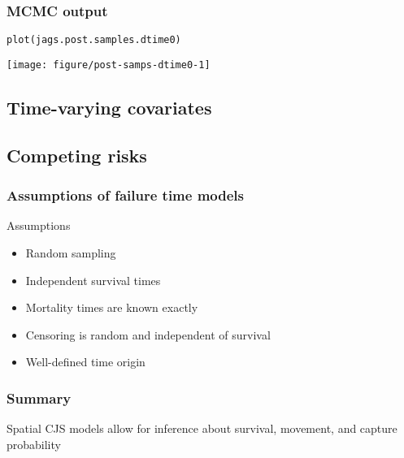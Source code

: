 \documentclass[color=usenames,dvipsnames]{beamer}\usepackage[]{graphicx}\usepackage[]{color}
\makeatletter
\newcommand{\hlstd}[1]{\textcolor[rgb]{0,0,0}{#1}}%
\newcommand{\hlkwd}[1]{\textcolor[rgb]{0.004,0.004,0.506}{#1}}%
\newenvironment{kframe}{%
 \def\at@end@of@kframe{}%
 \ifinner\ifhmode%
  \def\at@end@of@kframe{\end{minipage}}%
  \begin{minipage}{\columnwidth}%
 \fi\fi%
 \def\FrameCommand##1{\hskip\@totalleftmargin \hskip-\fboxsep
 \colorbox{shadecolor}{##1}\hskip-\fboxsep
     \hskip-\linewidth \hskip-\@totalleftmargin \hskip\columnwidth}%
 \MakeFramed {\advance\hsize-\width
   \@totalleftmargin\z@ \linewidth\hsize
   \@setminipage}}%
 {\par\unskip\endMakeFramed%
 \at@end@of@kframe}
\newenvironment{knitrout}{}{} %
\makeatother
\begin{document}
\begin{frame}[fragile]
  \frametitle{MCMC output}
\begin{knitrout}
\color{fgcolor}\begin{kframe}
\begin{alltt}
\hlkwd{plot}\hlstd{(jags.post.samples.dtime0)}
\end{alltt}
\end{kframe}

{\centering \texttt{[image: figure/post-samps-dtime0-1]} 

}


\end{knitrout}
\end{frame}






\subsection{Time-varying covariates}


\subsection{Competing risks}





\begin{frame}
  \frametitle{Assumptions of failure time models}
  Assumptions
  \begin{itemize}
    \item Random sampling
    \item Independent survival times
    \item Mortality times are known exactly
    \item Censoring is random and independent of survival
    \item Well-defined time origin
  \end{itemize}
\end{frame}











\begin{frame}
  \frametitle{Summary}
  \large
  Spatial CJS models allow for inference about survival,
  movement, and capture probability \\
\end{frame}
\end{document}
